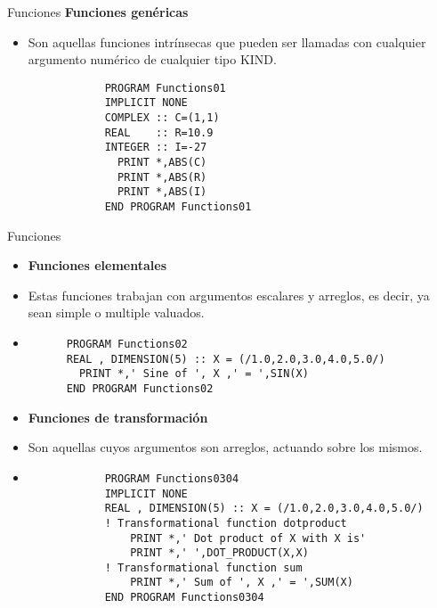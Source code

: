 \begin{frame}[fragile]{Funciones}
\textbf{Funciones genéricas}
 \begin{itemize}[<+(1)->]
  \item Son aquellas funciones intrínsecas que pueden ser llamadas con cualquier argumento numérico de cualquier tipo KIND.
        \begin{verbatim}
            PROGRAM Functions01
            IMPLICIT NONE
            COMPLEX :: C=(1,1)
            REAL    :: R=10.9
            INTEGER :: I=-27
              PRINT *,ABS(C)
              PRINT *,ABS(R)
              PRINT *,ABS(I)
            END PROGRAM Functions01
        \end{verbatim}
 \end{itemize}
\end{frame}

\begin{frame}[fragile]{Funciones}
 \begin{itemize}[<+(0)->]
  \item [] \textbf{Funciones elementales}
  \item Estas funciones trabajan con argumentos escalares y arreglos, es decir, ya sean simple o multiple valuados.
  \vspace{0.15cm}
  \item[]
      \begin{verbatim}
      PROGRAM Functions02
      REAL , DIMENSION(5) :: X = (/1.0,2.0,3.0,4.0,5.0/)
        PRINT *,' Sine of ', X ,' = ',SIN(X)
      END PROGRAM Functions02
      \end{verbatim}
  \item [] \textbf{Funciones de transformación}
  \item Son aquellas cuyos argumentos son arreglos, actuando sobre los mismos.
  \vspace{0.15cm}
  \item [] 
        \begin{verbatim}
            PROGRAM Functions0304     
            IMPLICIT NONE
            REAL , DIMENSION(5) :: X = (/1.0,2.0,3.0,4.0,5.0/)
            ! Transformational function dotproduct
                PRINT *,' Dot product of X with X is'
                PRINT *,' ',DOT_PRODUCT(X,X)
            ! Transformational function sum
                PRINT *,' Sum of ', X ,' = ',SUM(X)
            END PROGRAM Functions0304
        \end{verbatim}
 \end{itemize}
\end{frame}

